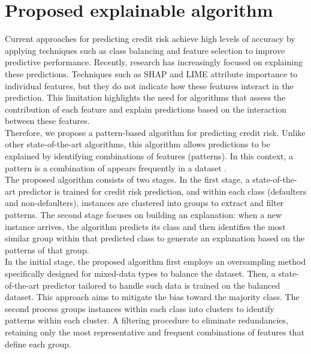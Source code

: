 \section{Proposed explainable algorithm}\label{sec:explainablealgorithm}

{\color{blue}
     Current approaches for predicting credit risk achieve high levels of accuracy by applying techniques such as class balancing and feature selection to improve predictive performance. Recently, research has increasingly focused on explaining these predictions. Techniques such as SHAP and LIME attribute importance to individual features, but they do not indicate how these features interact in the prediction. This limitation highlights the need for algorithms that assess the contribution of each feature and explain predictions based on the interaction between these features.\\
    
        Therefore, we propose a pattern-based algorithm for predicting credit risk. Unlike other state-of-the-art algorithms, this algorithm allows predictions to be explained by identifying combinations of features (patterns). In this context, a pattern is a combination of appears frequently in a dataset \cite{gutierrez2015mining, jia2020exploiting}. \\
    
        The proposed algorithm consists of two stages. In the first stage, a state-of-the-art predictor is trained for credit risk prediction, and within each class (defaulters and non-defaulters), instances are clustered into groups to extract and filter patterns. The second stage focuses on building an explanation: when a new instance arrives, the algorithm predicts its class and then identifies the most similar group within that predicted class to generate an explanation based on the patterns of that group.\\
    
        In the initial stage, the proposed algorithm first employs an oversampling method specifically designed for mixed-data types to balance the dataset. Then, a state-of-the-art predictor tailored to handle such data is trained on the balanced dataset. This approach aims to mitigate the bias toward the majority class. The second process groups instances within each class into clusters to identify patterns within each cluster. A filtering procedure to eliminate redundancies, retaining only the most representative and frequent combinations of features that define each group.\\

}
